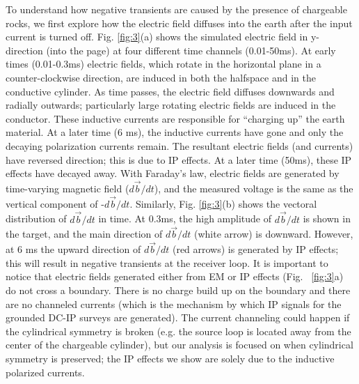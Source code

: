 \documentclass[manuscript]{geophysics}
\renewcommand {\b}  { {\vec b} }
\begin{document}
To understand how negative transients are caused by the presence of chargeable rocks, we first explore how the electric field diffuses into the earth after the input current is turned off.  Fig. \ref{fig:3}(a) shows the simulated electric field in y-direction (into the page) at four different time channels (0.01-50ms). At early times (0.01-0.3ms) electric fields, which rotate in the horizontal plane in a counter-clockwise direction, are induced in both the halfspace and in the conductive cylinder. As time passes, the electric field diffuses downwards and radially outwards; particularly large rotating electric fields are induced in the conductor. These inductive currents are responsible for ``charging up'' the earth material. At a later time (6 ms), the inductive currents have gone and only the decaying polarization currents remain. The resultant electric fields (and currents) have reversed direction; this is due to IP effects. At a later time (50ms), these IP effects have decayed away. With Faraday's law, electric fields are generated by time-varying magnetic field ($d\b/dt$), and the measured voltage is the same as the vertical component of -$d\b/dt$. Similarly, Fig. \ref{fig:3}(b) shows the vectoral distribution of $d\b/dt$ in time. At 0.3ms, the high amplitude of $d\b/dt$ is shown in the target, and the main direction of $d\b/dt$ (white arrow) is downward. However, at 6 ms the upward direction of $d\b/dt$ (red arrows) is generated by IP effects; this will result in negative transients at the receiver loop.
It is important to notice that electric fields generated either from EM or IP effects (Fig. ~\ref{fig:3}a)  do not cross a boundary. There is no charge build up on the boundary and there are no channeled currents (which is the mechanism by which IP signals for the grounded DC-IP surveys are generated). The current channeling  could happen if the cylindrical symmetry is broken (e.g. the source loop is located away from the center of the chargeable cylinder), but our analysis is focused on when cylindrical symmetry is preserved; the IP effects we show are solely due to the inductive polarized currents.
\end{document}
